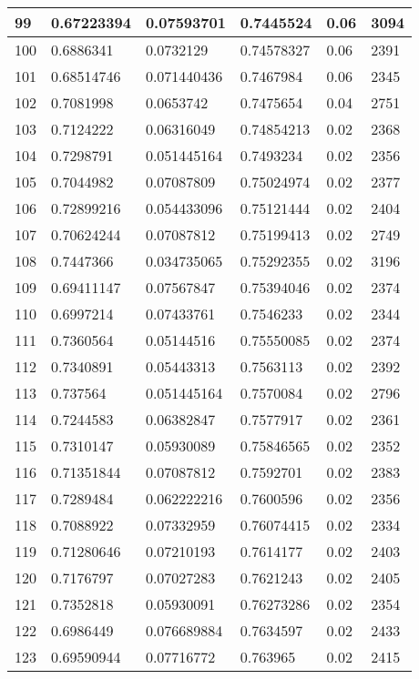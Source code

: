 \begin{longtable}{|l|l|l|l|l|l|}
99 & 0.67223394 & 0.07593701 & 0.7445524 & 0.06 & 3094 \\ \hline 
100 & 0.6886341 & 0.0732129 & 0.74578327 & 0.06 & 2391 \\ \hline 
101 & 0.68514746 & 0.071440436 & 0.7467984 & 0.06 & 2345 \\ \hline 
102 & 0.7081998 & 0.0653742 & 0.7475654 & 0.04 & 2751 \\ \hline 
103 & 0.7124222 & 0.06316049 & 0.74854213 & 0.02 & 2368 \\ \hline 
104 & 0.7298791 & 0.051445164 & 0.7493234 & 0.02 & 2356 \\ \hline 
105 & 0.7044982 & 0.07087809 & 0.75024974 & 0.02 & 2377 \\ \hline 
106 & 0.72899216 & 0.054433096 & 0.75121444 & 0.02 & 2404 \\ \hline 
107 & 0.70624244 & 0.07087812 & 0.75199413 & 0.02 & 2749 \\ \hline 
108 & 0.7447366 & 0.034735065 & 0.75292355 & 0.02 & 3196 \\ \hline 
109 & 0.69411147 & 0.07567847 & 0.75394046 & 0.02 & 2374 \\ \hline 
110 & 0.6997214 & 0.07433761 & 0.7546233 & 0.02 & 2344 \\ \hline 
111 & 0.7360564 & 0.05144516 & 0.75550085 & 0.02 & 2374 \\ \hline 
112 & 0.7340891 & 0.05443313 & 0.7563113 & 0.02 & 2392 \\ \hline 
113 & 0.737564 & 0.051445164 & 0.7570084 & 0.02 & 2796 \\ \hline 
114 & 0.7244583 & 0.06382847 & 0.7577917 & 0.02 & 2361 \\ \hline 
115 & 0.7310147 & 0.05930089 & 0.75846565 & 0.02 & 2352 \\ \hline 
116 & 0.71351844 & 0.07087812 & 0.7592701 & 0.02 & 2383 \\ \hline 
117 & 0.7289484 & 0.062222216 & 0.7600596 & 0.02 & 2356 \\ \hline 
118 & 0.7088922 & 0.07332959 & 0.76074415 & 0.02 & 2334 \\ \hline 
119 & 0.71280646 & 0.07210193 & 0.7614177 & 0.02 & 2403 \\ \hline 
120 & 0.7176797 & 0.07027283 & 0.7621243 & 0.02 & 2405 \\ \hline 
121 & 0.7352818 & 0.05930091 & 0.76273286 & 0.02 & 2354 \\ \hline 
122 & 0.6986449 & 0.076689884 & 0.7634597 & 0.02 & 2433 \\ \hline 
123 & 0.69590944 & 0.07716772 & 0.763965 & 0.02 & 2415 \\ \hline 

\end{longtable}
